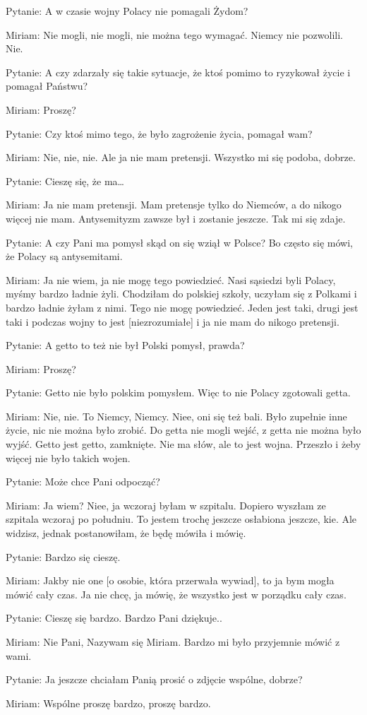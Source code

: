 Pytanie: A w czasie wojny Polacy nie pomagali Żydom? 

Miriam: Nie mogli, nie mogli, nie można tego wymagać. Niemcy nie pozwolili. Nie. 

Pytanie: A czy zdarzały się takie sytuacje, że ktoś pomimo to ryzykował życie i pomagał Państwu? 

Miriam: Proszę? 

Pytanie: Czy ktoś mimo tego, że było zagrożenie życia, pomagał wam? 

Miriam: Nie, nie, nie. Ale ja nie mam pretensji. Wszystko mi się podoba, dobrze.  

Pytanie: Cieszę się, że ma… 

Miriam: Ja nie mam pretensji. Mam pretensje tylko do Niemców, a do nikogo więcej nie mam. Antysemityzm zawsze był i zostanie jeszcze. Tak mi się zdaje. 

Pytanie: A czy Pani ma pomysł skąd on się wziął w Polsce? Bo często się mówi, że Polacy są antysemitami. 

Miriam: Ja nie wiem, ja nie mogę tego powiedzieć. Nasi sąsiedzi byli Polacy, myśmy bardzo ładnie żyli. Chodziłam do polskiej szkoły, uczyłam się z Polkami i bardzo ładnie żyłam z nimi. Tego nie mogę powiedzieć. Jeden jest taki, drugi jest taki i podczas wojny to jest [niezrozumiałe] i ja nie mam do nikogo pretensji. 

Pytanie: A getto to też nie był Polski pomysł, prawda? 

Miriam: Proszę? 

Pytanie: Getto nie było polskim pomysłem. Więc to nie Polacy zgotowali getta. 

Miriam: Nie, nie. To Niemcy, Niemcy. Niee, oni się też bali. Było zupełnie inne życie, nic nie można było zrobić. Do getta nie mogli wejść, z getta nie można było wyjść. Getto jest getto, zamknięte. Nie ma słów, ale to jest wojna. Przeszło i żeby więcej nie było takich wojen. 

Pytanie: Może chce Pani odpocząć? 

Miriam: Ja wiem? Niee, ja wczoraj byłam w szpitalu. Dopiero wyszłam ze szpitala wczoraj po południu. To jestem trochę jeszcze osłabiona jeszcze, kie. Ale widzisz, jednak postanowiłam, że będę mówiła i mówię. 

Pytanie: Bardzo się cieszę. 

Miriam: Jakby nie one [o osobie, która przerwała wywiad], to ja bym mogła mówić cały czas. Ja nie chcę, ja mówię, że wszystko jest w porządku cały czas. 

Pytanie: Cieszę się bardzo. Bardzo Pani dziękuje.. 

Miriam: Nie Pani, Nazywam się Miriam. Bardzo mi było przyjemnie mówić z wami. 

Pytanie: Ja jeszcze chciałam Panią prosić o zdjęcie wspólne, dobrze? 

Miriam: Wspólne proszę bardzo, proszę bardzo. 